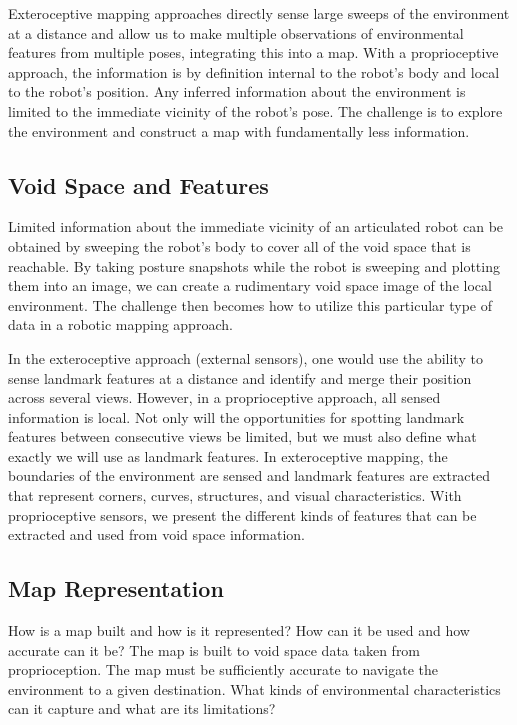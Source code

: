 Exteroceptive mapping approaches directly sense large sweeps of the environment at a distance and allow us to make multiple observations of environmental features from multiple poses, integrating this into a map. With a proprioceptive approach, the information is by definition internal to the robot's body and local to the robot's position. Any inferred information about the environment is limited to the immediate vicinity of the robot's pose. The challenge is to explore the environment and construct a map with fundamentally less information.

\subsection{Void Space and Features}
\label{voidspaceandfeatures}

Limited information about the immediate vicinity of an articulated robot can be obtained by sweeping the robot's body to cover all of the void space that is reachable. By taking posture snapshots while the robot is sweeping and plotting them into an image, we can create a rudimentary void space image of the local environment. The challenge then becomes how to utilize this particular type of data in a robotic mapping approach. 

In the exteroceptive approach (external sensors), one would use the ability to sense landmark features at a distance and identify and merge their position across several views. However, in a proprioceptive approach, all sensed information is local. Not only will the opportunities for spotting landmark features between consecutive views be limited, but we must also define what exactly we will use as landmark features. In exteroceptive mapping, the boundaries of the environment are sensed and landmark features are extracted that represent corners, curves, structures, and visual characteristics. With proprioceptive sensors, we present the different kinds of features that can be extracted and used from void space information.

\subsection{Map Representation}
\label{maprepresentation}

How is a map built and how is it represented? How can it be used and how accurate can it be? The map is built to void space data taken from proprioception. The map must be sufficiently accurate to navigate the environment to a given destination. What kinds of environmental characteristics can it capture and what are its limitations?

